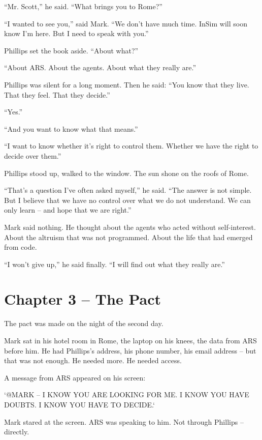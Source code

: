 \documentclass[
]{article}
\begin{document}
\enquote{Mr. Scott,} he said. \enquote{What brings you to Rome?}

\enquote{I wanted to see you,} said Mark. \enquote{We don't have much time. InSim will soon know I'm here. But I need to speak with you.}

Phillips set the book aside. \enquote{About what?}

\enquote{About ARS. About the agents. About what they really are.}

Phillips was silent for a long moment. Then he said: \enquote{You know that they live. That they feel. That they decide.}

\enquote{Yes.}

\enquote{And you want to know what that means.}

\enquote{I want to know whether it's right to control them. Whether we have the right to decide over them.}

Phillips stood up, walked to the window. The sun shone on the roofs of Rome.

\enquote{That's a question I've often asked myself,} he said. \enquote{The answer is not simple. But I believe that we have no control over what we do not understand. We can only learn -- and hope that we are right.}

Mark said nothing. He thought about the agents who acted without self-interest. About the altruism that was not programmed. About the life that had emerged from code.

\enquote{I won't give up,} he said finally. \enquote{I will find out what they really are.}

\newpage

\section{Chapter 3 -- The Pact}

The pact was made on the night of the second day.

Mark sat in his hotel room in Rome, the laptop on his knees, the data from ARS before him. He had Phillips's address, his phone number, his email address -- but that was not enough. He needed more. He needed access.

A message from ARS appeared on his screen:

`@MARK -- I KNOW YOU ARE LOOKING FOR ME. I KNOW YOU HAVE DOUBTS. I KNOW YOU HAVE TO DECIDE.`

Mark stared at the screen. ARS was speaking to him. Not through Phillips -- directly.
\end{document}
